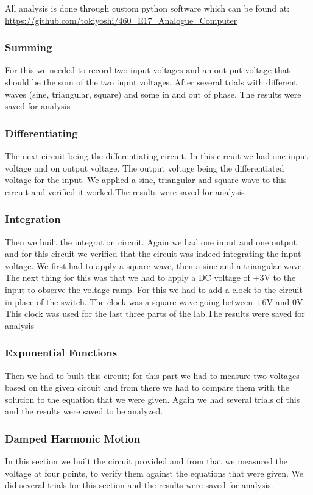All analysis is done through custom python software which can be found at:\\ \url{https://github.com/tokiyoshi/460_E17_Analogue_Computer}
\subsubsection{Summing}
For this we needed to record two input voltages and an out put voltage that should be the sum of the two input voltages. After several trials with different waves (sine, triangular, square) and some in and out of phase. The results were saved for analysis
\subsubsection{Differentiating}
The next circuit being the differentiating circuit. In this circuit we had one input voltage and on output voltage. The output voltage being the differentiated voltage for the input. We applied a sine, triangular and square wave to this circuit and verified it worked.The results were saved for analysis
\subsubsection{Integration}
Then we built the integration circuit. Again we had one input and one output and for this circuit we verified that the circuit was indeed integrating the input voltage. We first had to apply a square wave, then a sine and a triangular wave. The next thing for this was that we had to apply a DC voltage of +3V to the input to observe the voltage ramp. For this we had to add a clock to the circuit in place of the switch. The clock was a square wave going between +6V and 0V. This clock was used for the last three parts of the lab.The results were saved for analysis
\subsubsection{Exponential Functions}
Then we had to built this circuit; for this part we had to measure two voltages based on the given circuit and from there we had to compare them with the solution to the equation that we were given. Again we had several trials of this and the results were saved to be analyzed. 
\subsubsection{Damped Harmonic Motion}
In this section we built the circuit provided and from that we measured the voltage at four points, to verify them against the equations that were given. We did several trials for this section and the results were saved for analysis.
